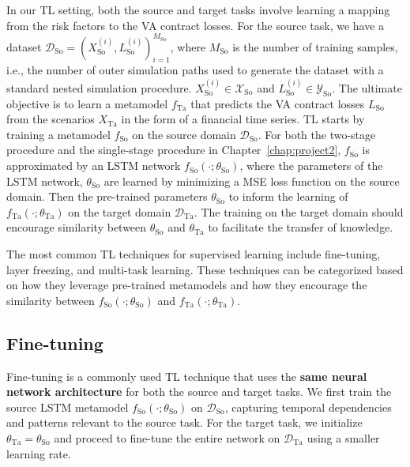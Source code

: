 In our TL setting, both the source and target tasks involve learning a mapping from the risk factors to the VA contract losses.
For the source task, we have a dataset $\mathcal{D}_{\text{So}} = { (X_{\text{So}}^{(i)}, L_{\text{So}}^{(i)}) }_{i=1}^{M_{\text{So}}}$, where $M_{\text{So}}$ is the number of training samples, i.e., the number of outer simulation paths used to generate the dataset with a standard nested simulation procedure.
$X_{\text{So}}^{(i)} \in \mathcal{X}_{\text{So}}$ and $L_{\text{So}}^{(i)} \in \mathcal{Y}_{\text{So}}$.
The ultimate objective is to learn a metamodel $f_{\text{Ta}}$ that predicts the VA contract losses $L_{\text{So}}$ from the scenarios $X_{\text{Ta}}$ in the form of a financial time series.
TL starts by training a metamodel $f_{\text{So}}$ on the source domain $\mathcal{D}_{\text{So}}$.
For both the two-stage procedure and the single-stage procedure in Chapter~\ref{chap:project2}, $f_{\text{So}}$ is approximated by an LSTM network $f_{\text{So}}(\cdot ; \theta_{\text{So}})$, where the parameters of the LSTM network, $\theta_{\text{So}}$ are learned by minimizing a MSE loss function on the source domain.
Then the pre-trained parameters $\theta_{\text{So}}$ to inform the learning of $f_{\text{Ta}}(\cdot ; \theta_{\text{Ta}})$ on the target domain $\mathcal{D}_{\text{Ta}}$.
The training on the target domain should encourage similarity between $\theta_{\text{So}}$ and $\theta_{\text{Ta}}$ to facilitate the transfer of knowledge.

The most common TL techniques for supervised learning include fine-tuning, layer freezing, and multi-task learning. 
These techniques can be categorized based on how they leverage pre-trained metamodels and how they encourage the similarity between $f_{\text{So}}(\cdot ; \theta_{\text{So}})$ and $f_{\text{Ta}}(\cdot ; \theta_{\text{Ta}})$.

\subsection{Fine-tuning}

Fine-tuning is a commonly used TL technique that uses the \textbf{same neural network architecture} for both the source and target tasks.
We first train the source LSTM metamodel $f_{\text{So}}(\cdot; \theta_{\text{So}})$ on $\mathcal{D}_{\text{So}}$, capturing temporal dependencies and patterns relevant to the source task. 
For the target task, we initialize $\theta_{\text{Ta}} = \theta_{\text{So}}$ and proceed to fine-tune the entire network on $\mathcal{D}_{\text{Ta}}$ using a smaller learning rate. 

